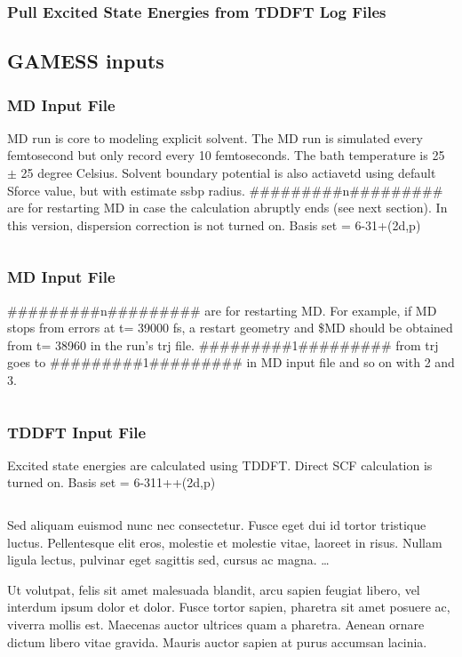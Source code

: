 \documentclass[
journal=jacsat, %
manuscript=article]{achemso}
\begin{document}
		
		\subsubsection{Pull Excited State Energies from TDDFT Log Files}
		
		
	\subsection{GAMESS inputs}
		\subsubsection{MD Input File}
			 MD run is core to modeling explicit solvent. The MD run is simulated every femtosecond but only record every 10 femtoseconds. The bath temperature is 25 $\pm$ 25 degree Celsius. Solvent boundary potential is also actiavetd using default Sforce value, but with estimate ssbp radius. \#\#\#\#\#\#\#\#\#n\#\#\#\#\#\#\#\#\# are for restarting MD in case the calculation abruptly ends (see next section). In this version, dispersion correction is not turned on. Basis set = 6-31+(2d,p)
			 \inputminted[linenos, breaklines, baselinestretch=1, fontsize=\small]{Perl}{../GAMESSinpSample/MD_aniline32.inp}
			 
		\subsubsection{MD Input File}
		\#\#\#\#\#\#\#\#\#n\#\#\#\#\#\#\#\#\# are for restarting MD. For example, if MD stops from errors at t= 39000 fs, a restart geometry and \$MD should be obtained from t= 38960 in the run's trj file. \#\#\#\#\#\#\#\#\#1\#\#\#\#\#\#\#\#\# from trj goes to \#\#\#\#\#\#\#\#\#1\#\#\#\#\#\#\#\#\# in MD input file and so on with 2 and 3.
		\inputminted[linenos, breaklines, baselinestretch=1, fontsize=\small]{Perl}{../GAMESSinpSample/MD_aniline32.inp}
		
		\subsubsection{TDDFT Input File}
			Excited state energies are calculated using TDDFT. Direct SCF calculation is turned on. Basis set = 6-311++(2d,p)
			\inputminted[linenos, breaklines, baselinestretch=1, fontsize=\small]{Perl}{../GAMESSinpSample/TDDFT_aniline32_15010.inp}


\acknowledgement

Sed aliquam euismod nunc nec consectetur. Fusce eget dui id tortor tristique luctus. Pellentesque elit eros, molestie et molestie vitae, laoreet in risus. Nullam ligula lectus, pulvinar eget sagittis sed, cursus ac magna. \ldots


\suppinfo

Ut volutpat, felis sit amet malesuada blandit, arcu sapien feugiat libero, vel interdum ipsum dolor et dolor. Fusce tortor sapien, pharetra sit amet posuere ac, viverra mollis est. Maecenas auctor ultrices quam a pharetra. Aenean ornare dictum libero vitae gravida. Mauris auctor sapien at purus accumsan lacinia.


\end{document}
